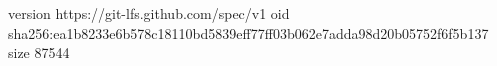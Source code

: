version https://git-lfs.github.com/spec/v1
oid sha256:ea1b8233e6b578c18110bd5839eff77ff03b062e7adda98d20b05752f6f5b137
size 87544
